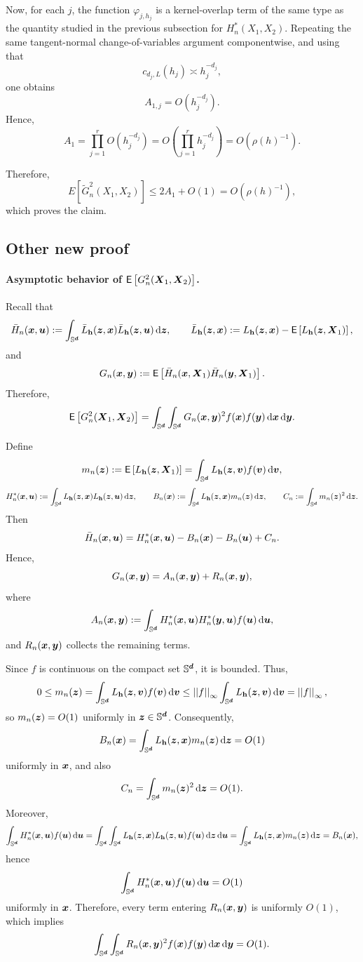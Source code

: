 \documentclass{article}
\begin{document}
Now, for each $j$, the function $\varphi_{j,h_j}$ is a kernel-overlap term of the same type as the
quantity studied in the previous subsection for $H_n^*(X_1,X_2)$. Repeating the same tangent-normal
change-of-variables argument componentwise, and using that
\[
c_{d_j,L}(h_j)\asymp h_j^{-d_j},
\]
one obtains
\[
A_{1,j}=O(h_j^{-d_j}).
\]
Hence,
\[
A_1
=
\prod_{j=1}^r O(h_j^{-d_j})
=
O\!\left(\prod_{j=1}^r h_j^{-d_j}\right)
=
O(\rho(h)^{-1}).
\]

Therefore,
\[
E\!\left[\widetilde G_n^2(X_1,X_2)\right]
\le
2A_1+O(1)
=
O(\rho(h)^{-1}),
\]
which proves the claim.

\subsection{Other new proof}

\paragraph{Asymptotic behavior of $\mathsf{E}\lrc{G_n^2(\bX_1,\bX_2)}$.}
Recall that
\[
\bar H_n(\bx,\bu) \defin \int_{\Sr} \bar L_{\bh}(\bz,\bx)\bar L_{\bh}(\bz,\bu)\,\rd \bz,
\qquad
\bar L_{\bh}(\bz,\bx) \defin L_{\bh}(\bz,\bx)-\mathsf{E}\lrc{L_{\bh}(\bz,\bX_1)},
\]
and
\[
G_n(\bx,\by) \defin \mathsf{E}\lrc{\bar H_n(\bx,\bX_1)\bar H_n(\by,\bX_1)}.
\]
Therefore,
\[
\mathsf{E}\lrc{G_n^2(\bX_1,\bX_2)}
=
\int_{\Sr}\int_{\Sr} G_n(\bx,\by)^2 f(\bx)f(\by)\,\rd \bx\,\rd \by.
\]

Define
\[
m_n(\bz) \defin \mathsf{E}\lrc{L_{\bh}(\bz,\bX_1)}
=
\int_{\Sr} L_{\bh}(\bz,\bv)f(\bv)\,\rd \bv,
\]
\[
H_n^\ast(\bx,\bu) \defin \int_{\Sr} L_{\bh}(\bz,\bx)L_{\bh}(\bz,\bu)\,\rd \bz,
\qquad
B_n(\bx) \defin \int_{\Sr} L_{\bh}(\bz,\bx)m_n(\bz)\,\rd \bz,
\qquad
C_n \defin \int_{\Sr} m_n(\bz)^2\,\rd \bz.
\]
Then
\[
\bar H_n(\bx,\bu)=H_n^\ast(\bx,\bu)-B_n(\bx)-B_n(\bu)+C_n.
\]
Hence,
\[
G_n(\bx,\by)=A_n(\bx,\by)+R_n(\bx,\by),
\]
where
\[
A_n(\bx,\by)\defin \int_{\Sr} H_n^\ast(\bx,\bu)H_n^\ast(\by,\bu)f(\bu)\,\rd \bu,
\]
and \(R_n(\bx,\by)\) collects the remaining terms.

Since \(f\) is continuous on the compact set \(\Sr\), it is bounded. Thus,
\[
0 \le m_n(\bz)=\int_{\Sr}L_{\bh}(\bz,\bv)f(\bv)\,\rd \bv
\le \norm{f}_\infty \int_{\Sr}L_{\bh}(\bz,\bv)\,\rd \bv
= \norm{f}_\infty,
\]
so \(m_n(\bz)=O(1)\) uniformly in \(\bz\in\Sr\). Consequently,
\[
B_n(\bx)=\int_{\Sr}L_{\bh}(\bz,\bx)m_n(\bz)\,\rd \bz=O(1)
\]
uniformly in \(\bx\), and also
\[
C_n=\int_{\Sr}m_n(\bz)^2\,\rd \bz=O(1).
\]
Moreover,
\[
\int_{\Sr} H_n^\ast(\bx,\bu)f(\bu)\,\rd \bu
=
\int_{\Sr}\int_{\Sr} L_{\bh}(\bz,\bx)L_{\bh}(\bz,\bu)f(\bu)\,\rd \bz\,\rd \bu
=
\int_{\Sr}L_{\bh}(\bz,\bx)m_n(\bz)\,\rd \bz
=
B_n(\bx),
\]
hence
\[
\int_{\Sr} H_n^\ast(\bx,\bu)f(\bu)\,\rd \bu=O(1)
\]
uniformly in \(\bx\). Therefore, every term entering \(R_n(\bx,\by)\) is uniformly \(O(1)\), which
implies
\[
\int_{\Sr}\int_{\Sr}R_n(\bx,\by)^2f(\bx)f(\by)\,\rd \bx\,\rd \by=O(1).
\]
\end{document}
